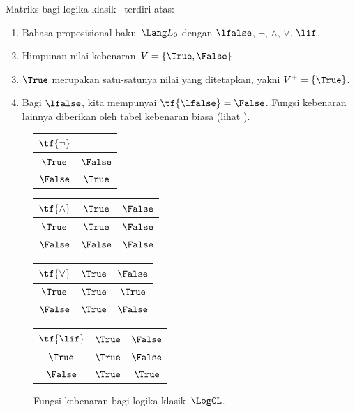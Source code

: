 \documentclass[../../../include/open-logic-section]{subfiles}
\begin{document}
\begin{ex}
Matriks bagi logika klasik~\LogCL{} terdiri atas:
\begin{enumerate}
  \item Bahasa proposisional baku~$\Lang L_0$ dengan $\lfalse$, $\lnot$,
  $\land$, $\lor$, $\lif$.
  \item Himpunan nilai kebenaran~$V=\{\True,\False\}$.
  \item $\True$ merupakan satu-satunya nilai yang ditetapkan, yakni
  $V^+=\{\True\}$.
  \item Bagi $\lfalse$, kita mempunyai $\tf{\lfalse}=\False$. Fungsi
  kebenaran lainnya diberikan oleh tabel kebenaran biasa (lihat
  ).
\end{enumerate}
\begin{figure}
  \begin{center}
      \begin{tabular}{c|c}
        $\tf{\lnot}$ & \\
        \hline
        $\True$ & $\False$ \\
        $\False$ & $\True$
      \end{tabular}
      \quad
      \begin{tabular}{c|cc}
        $\tf{\land}$ & $\True$ & $\False$ \\
        \hline
        $\True$ & $\True$ & $\False$ \\
        $\False$ & $\False$ & $\False$
      \end{tabular}
      \quad
      \begin{tabular}{c|cc}
        $\tf{\lor}$ & $\True$ & $\False$ \\
        \hline
        $\True$ & $\True$ & $\True$ \\
        $\False$ & $\True$ & $\False$
      \end{tabular}
      \quad
      \begin{tabular}{c|cc}
        $\tf{\lif}$ & $\True$ & $\False$ \\
        \hline
        $\True$ & $\True$ & $\False$ \\
        $\False$ & $\True$ & $\True$
      \end{tabular}
    \end{center}
    \caption{Fungsi kebenaran bagi logika klasik~$\LogCL$.}
  \end{figure}
\end{ex}
\end{document}
